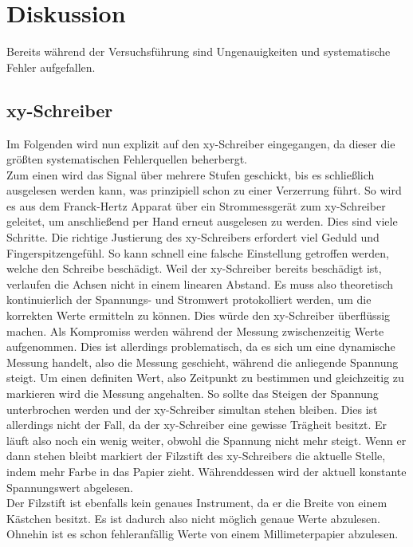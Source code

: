 %

%
\section{Diskussion}
\label{sec:Diskussion}

Bereits während der Versuchsführung sind Ungenauigkeiten und systematische Fehler aufgefallen. 

\subsection{xy-Schreiber}
Im Folgenden wird nun explizit auf den xy-Schreiber eingegangen, da dieser die größten systematischen Fehlerquellen beherbergt.\\
Zum einen wird das Signal über mehrere Stufen geschickt, bis es schließlich ausgelesen werden kann, was prinzipiell schon zu einer 
Verzerrung führt. So wird es aus dem Franck-Hertz Apparat über ein Strommessgerät zum xy-Schreiber geleitet, um anschließend per Hand 
erneut ausgelesen zu werden. Dies sind viele Schritte. 
Die richtige Justierung des xy-Schreibers erfordert viel Geduld und Fingerspitzengefühl. So kann schnell eine falsche Einstellung getroffen 
werden, welche den Schreibe beschädigt. Weil der xy-Schreiber bereits beschädigt ist, verlaufen die Achsen nicht in einem linearen Abstand. 
Es muss also theoretisch kontinuierlich der Spannungs- und Stromwert protokolliert werden, um die korrekten Werte ermitteln zu können. Dies 
würde den xy-Schreiber überflüssig machen. Als Kompromiss werden während der Messung zwischenzeitig Werte aufgenommen. Dies ist allerdings 
problematisch, da es sich um eine dynamische Messung handelt, also die Messung geschieht, während die anliegende Spannung steigt. Um einen 
definiten Wert, also Zeitpunkt zu bestimmen und gleichzeitig zu markieren wird die Messung angehalten. So sollte das Steigen der Spannung 
unterbrochen werden und der xy-Schreiber simultan stehen bleiben. Dies ist allerdings nicht der Fall, da der xy-Schreiber eine gewisse 
Trägheit besitzt. Er läuft also noch ein wenig weiter, obwohl die Spannung nicht mehr steigt. Wenn er dann stehen bleibt markiert der 
Filzstift des xy-Schreibers die aktuelle Stelle, indem mehr Farbe in das Papier zieht. Währenddessen wird der aktuell konstante Spannungswert 
abgelesen.\\
Der Filzstift ist ebenfalls kein genaues Instrument, da er die Breite von einem Kästchen besitzt. Es ist dadurch also nicht möglich genaue 
Werte abzulesen. Ohnehin ist es schon fehleranfällig Werte von einem Millimeterpapier abzulesen.    

